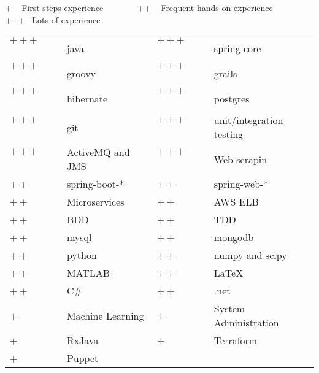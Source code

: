 
\newcommand{\plus}{$+~$~~~~}
\newcommand{\pplus}{$++~$~~~~}
\newcommand{\ppplus}{$+++$~~~~~}
\begin{cventries}
\cventry
{+ ~ First-steps experience ~~~  ~~~ ++ ~ Frequent hands-on experience ~~~  ~~~ +++ ~Lots of experience \vspace{0.1em}} %
{} %
{} %
{} %
{ %
\setlength{\tabcolsep}{3pt}
\begin{tabular}{  l l @{\hskip 1in} l l }
           \ppplus & java & \ppplus & spring-core \\ 
           \ppplus & groovy & \ppplus & grails  \\
           \ppplus & hibernate & \ppplus & postgres  \\                      
           \ppplus & git & \ppplus & unit/integration testing  \\
		   \ppplus & ActiveMQ and JMS & \ppplus & Web scrapin\vspace{0.7em}\\
           \pplus & spring-boot-* & \pplus & spring-web-*  \\ 
           \pplus & Microservices & \pplus & AWS ELB  \\ 
           \pplus & BDD &\pplus & TDD \\ 
           \pplus & mysql &\pplus & mongodb \\ 
           \pplus & python  & \pplus & numpy and scipy \\ 
		   \pplus & MATLAB & \pplus & \LaTeX \\
		   \pplus & C\# & \pplus & .net \vspace{0.7em}   \\                   
           \plus & Machine Learning &\plus & System Administration \\
           \plus & RxJava & \plus & Terraform\\
		   \plus & Puppet 
\end{tabular}
}
\end{cventries}
